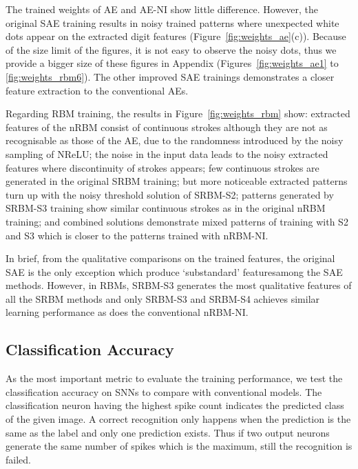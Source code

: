 The trained weights of AE and AE-NI show little difference.
However, the original SAE training results in noisy trained patterns where unexpected white dots appear on the extracted digit features (Figure~\ref{fig:weights_ae}(c)).
Because of the size limit of the figures, it is not easy to observe the noisy dots, thus we provide a bigger size of these figures in Appendix (Figures~\ref{fig:weights_ae1} to \ref{fig:weights_rbm6}).
The other improved SAE trainings demonstrates a closer feature extraction to the conventional AEs.



Regarding RBM training,
the results in Figure~\ref{fig:weights_rbm} show:
extracted features of the nRBM consist of continuous strokes although they are not as recognisable as those of the AE, due to the randomness introduced by the noisy sampling of NReLU;
the noise in the input data leads to the noisy extracted features where discontinuity of strokes appears;
few continuous strokes are generated in the original SRBM training;
but more noticeable extracted patterns turn up with the noisy threshold solution of SRBM-S2;
patterns generated by SRBM-S3 training show similar continuous strokes as in the original nRBM training;
and combined solutions demonstrate mixed patterns of training with S2 and S3 which is closer to the patterns trained with nRBM-NI. 

In brief, from the qualitative comparisons on the trained features, the original SAE is the only exception which produce `substandard' features\DIFaddbegin {}\DIFaddend among the SAE methods.
However, in RBMs, SRBM-S3 generates the most qualitative features of all the SRBM methods and only SRBM-S3 and SRBM-S4 achieves similar learning performance as does the conventional nRBM-NI.
\subsection{Classification Accuracy}
\label{subsec:MNIST_ca}
As the most important metric to evaluate the training performance, we test the classification accuracy on SNNs to compare with conventional models.
The classification neuron having the highest spike count indicates the predicted class of the given image.
A correct recognition only happens when the prediction is the same as the label and only one prediction exists.
Thus if two output neurons generate the same number of spikes which is the maximum, still the recognition is failed.

